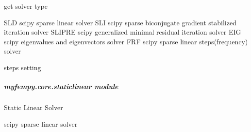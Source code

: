 \documentclass[letterpaper,10pt,english]{sphinxmanual}
\begin{document}

\begin{fulllineitems}
\label{\detokenize{myfempy.core:myfempy.core.solverset.get_solve}}
\pysigstartsignatures
{}
\pysigstopsignatures
\sphinxAtStartPar
get solver type

\sphinxAtStartPar
SLD     \textendash{} scipy sparse linear solver 
SLI     \textendash{} scipy sparse biconjugate gradient stabilized iteration solver 
SLIPRE  \textendash{} scipy generalized minimal residual iteration solver
EIG     \textendash{} scipy eigenvalues and eigenvectors solver
FRF     \textendash{} scipy sparse linear steps(frequency) solver

\end{fulllineitems}


\begin{fulllineitems}
\label{\detokenize{myfempy.core:myfempy.core.solverset.step_setting}}
\pysigstartsignatures
{}
\pysigstopsignatures
\sphinxAtStartPar
steps setting

\end{fulllineitems}



\subparagraph{myfempy.core.staticlinear module}
\label{\detokenize{myfempy.core:module-myfempy.core.staticlinear}}\label{\detokenize{myfempy.core:myfempy-core-staticlinear-module}}
\sphinxAtStartPar
Static Linear Solver

\begin{fulllineitems}
\label{\detokenize{myfempy.core:myfempy.core.staticlinear.sld}}
\pysigstartsignatures
{}
\pysigstopsignatures
\sphinxAtStartPar
scipy sparse linear solver

\end{fulllineitems}
\end{document}
